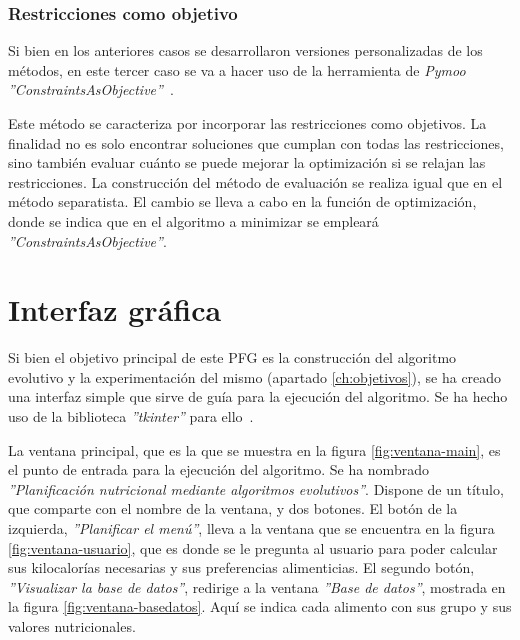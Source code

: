 \subsubsection{Restricciones como objetivo}
\label{ch:restricciones-objetivo}

Si bien en los anteriores casos se desarrollaron versiones personalizadas de los métodos, en este tercer caso se va a hacer uso de la herramienta de \textit{Pymoo} \textit{''ConstraintsAsObjective''}~\cite{pymoo_constraints_as_obj}.

Este método se caracteriza por incorporar las restricciones como objetivos. La finalidad no es solo encontrar soluciones que cumplan con todas las restricciones, sino también evaluar cuánto se puede mejorar la optimización si se relajan las restricciones. La construcción del método de evaluación se realiza igual que en el método separatista. El cambio se lleva a cabo en la función de optimización, donde se indica que en el algoritmo a minimizar se empleará \textit{''ConstraintsAsObjective''}.
\section{Interfaz gráfica}
\label{ch:interfaz-grafica}

Si bien el objetivo principal de este PFG es la construcción del algoritmo evolutivo y la experimentación del mismo (apartado \ref{ch:objetivos}), se ha creado una interfaz simple que sirve de guía para la ejecución del algoritmo. Se ha hecho uso de la biblioteca \textit{''tkinter''} para ello~\cite{python_tkinter}.

La ventana principal, que es la que se muestra en la figura \ref{fig:ventana-main}, es el punto de entrada para la ejecución del algoritmo. Se ha nombrado \textit{''Planificación nutricional mediante algoritmos evolutivos''}. Dispone de un título, que comparte con el nombre de la ventana, y dos botones. El botón de la izquierda, \textit{''Planificar el menú''}, lleva a la ventana que se encuentra en la figura \ref{fig:ventana-usuario}, que es donde se le pregunta al usuario para poder calcular sus kilocalorías necesarias y sus preferencias alimenticias. El segundo botón, \textit{''Visualizar la base de datos''}, redirige a la ventana \textit{''Base de datos''}, mostrada en la figura \ref{fig:ventana-basedatos}. Aquí se indica cada alimento con sus grupo y sus valores nutricionales.

